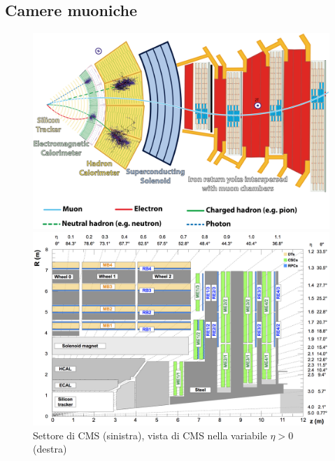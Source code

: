 \subsection{Camere muoniche}

\begin{figure}[h]
  \centering
  \begin{minipage}[b]{0.48\textwidth}
      \centering
      \includegraphics[width=\textwidth]{../ImmaginiTesi/CMS slice.png} 
  \end{minipage}
  \hfill 
  \begin{minipage}[b]{0.48\textwidth}
      \centering
      \includegraphics[width=\textwidth]{../ImmaginiTesi/CMSEtaView.png} 
  \end{minipage}
  \caption{Settore di CMS (sinistra), vista di CMS  nella variabile $\eta > 0$ (destra)}
  \label{fig:SectorEtaView}
\end{figure}


